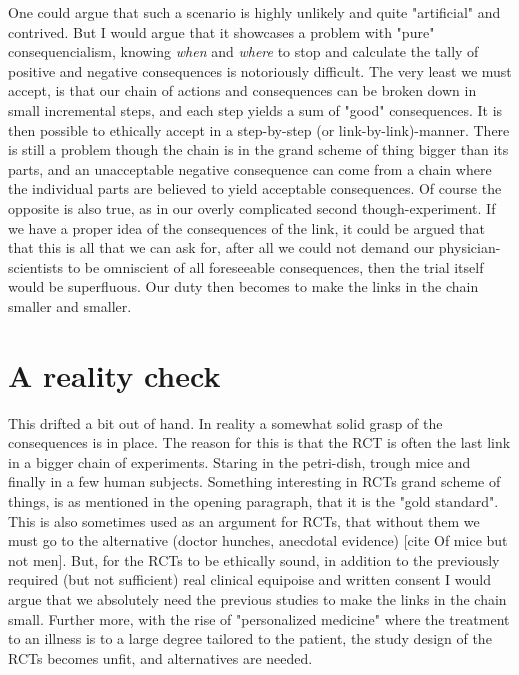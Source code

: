\documentclass[12p]{article}
\begin{document}
One could argue that such a scenario is highly unlikely and quite "artificial" and contrived. %
But I would argue that it showcases a problem with "pure" consequencialism, knowing \emph{when} and \emph{where} to stop and calculate the tally of positive and negative consequences is notoriously difficult.
The very least we must accept, is that our chain of actions and consequences can be broken down in small incremental steps, and each step yields a sum of "good" consequences.
It is then possible to ethically accept in a step-by-step (or link-by-link)-manner.
There is still a problem though the chain is in the grand scheme of thing bigger than its parts, and an unacceptable  negative consequence can come from a chain where the individual parts are believed to yield acceptable consequences.
Of course the opposite is also true, as in our overly complicated second though-experiment.
If we have a proper idea of the consequences of the link, it could be argued that that this is all that we can ask for, after all we could not demand our physician-scientists to be omniscient of all foreseeable consequences, then the trial itself would be superfluous.
Our duty then becomes to make the links in the chain smaller and smaller.



\section*{A reality check}

This drifted a bit out of hand.
In reality a somewhat solid grasp of the consequences is in place.
The reason for this is that the RCT is often the last link in a bigger chain of experiments. 
Staring in the petri-dish, trough mice and finally in a few human subjects.
Something interesting in RCTs grand scheme of things, is as mentioned in the opening paragraph, that it is the "gold standard".
This is also sometimes used as an argument for RCTs, that without them we must go to the alternative (doctor hunches, anecdotal evidence) [cite Of mice but not men].
But, for the RCTs to be ethically sound, in addition to the previously required (but not sufficient) real clinical equipoise and written consent I would argue that we absolutely need the previous studies to make the links in the chain small.
Further more, with the rise of "personalized medicine" where the treatment to an illness is to a large degree tailored to the patient, the study design of the RCTs becomes unfit, and alternatives are needed.
\end{document}

